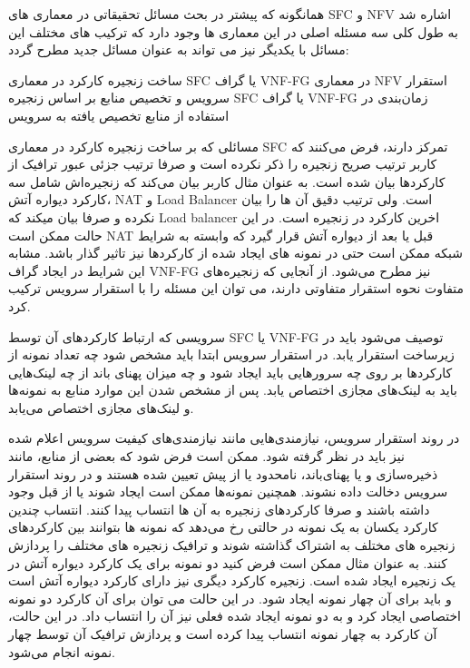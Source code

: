 
همانگونه که پیشتر در بحث مسائل تحقیقاتی در معماری های SFC و NFV اشاره شد به طول کلی سه مسئله اصلی در این معماری ها وجود دارد که ترکیب های مختلف این مسائل با یکدیگر نیز می تواند به عنوان مسائل جدید مطرح گردد:

 ساخت زنجیره کارکرد در معماری SFC یا گراف VNF-FG در معماری NFV
 استقرار سرویس و تخصیص منابع بر اساس زنجیره SFC یا گراف VNF-FG
 زمان‌بندی در استفاده از منابع تخصیص یافته به سرویس

مسائلی که بر ساخت زنجیره کارکرد در معماری SFC تمرکز دارند، فرض می‌کنند که کاربر ترتیب صریح زنجیره را ذکر نکرده است و صرفا ترتیب جزئی عبور ترافیک از کارکردها بیان شده است.
به عنوان مثال کاربر بیان می‌کند که زنجیره‌اش شامل سه کارکرد دیواره آتش، NAT و Load Balancer است. ولی ترتیب دقیق آن ها را بیان نکرده و صرفا بیان میکند که Load balancer اخرین کارکرد در زنجیره است.
در این حالت ممکن است NAT قبل یا بعد از دیواره آتش قرار گیرد که وابسته به شرایط شبکه ممکن است حتی در نمونه های ایجاد شده از کارکردها نیز تاثیر گذار باشد.
مشابه این شرایط در ایجاد گراف VNF-FG نیز مطرح می‌شود. از آنجایی که زنجیره‌های متفاوت نحوه استقرار متفاوتی دارند، می توان این مسئله را با استقرار سرویس ترکیب کرد.

سرویسی که ارتباط کارکردهای آن توسط SFC یا VNF-FG توصیف می‌شود باید در زیرساخت استقرار یابد.
در استقرار سرویس ابتدا باید مشخص شود چه تعداد نمونه از کارکردها بر روی چه سرورهایی باید ایجاد شود و چه میزان پهنای باند از چه لینک‌هایی باید به لینک‌های مجازی اختصاص یابد.
پس از مشخص شدن این موارد منابع به نمونه‌ها و لینک‌های مجازی اختصاص می‌یابد.

در روند استقرار سرویس، نیازمندی‌هایی مانند نیازمندی‌های کیفیت سرویس اعلام شده نیز باید در نظر گرفته شود.
ممکن است فرض شود که بعضی از منابع، مانند ذخیره‌سازی و یا پهنای‌باند، نامحدود یا از پیش تعیین شده هستند و در روند استقرار سرویس دخالت داده نشوند.
همچنین نمونه‌ها ممکن است ایجاد شوند یا از قبل وجود داشته باشند و صرفا کارکردهای زنجیره به آن ها انتساب پیدا کنند.
انتساب چندین کارکرد یکسان به یک نمونه در حالتی رخ می‌دهد که نمونه ها بتوانند بین کارکردهای زنجیره های مختلف به اشتراک گذاشته شوند و ترافیک زنجیره های مختلف را پردازش کنند.
به عنوان مثال ممکن است فرض کنید دو نمونه برای یک کارکرد دیواره آتش در یک زنجیره ایجاد شده است. زنجیره کارکرد دیگری نیز دارای کارکرد دیواره آتش است و باید برای آن چهار نمونه ایجاد شود.
در این حالت می توان برای آن کارکرد دو نمونه اختصاصی ایجاد کرد و به دو نمونه ایجاد شده فعلی نیز آن را انتساب داد.
در این حالت، آن کارکرد به چهار نمونه انتساب پیدا کرده است و پردازش ترافیک آن توسط چهار نمونه انجام می‌شود.

